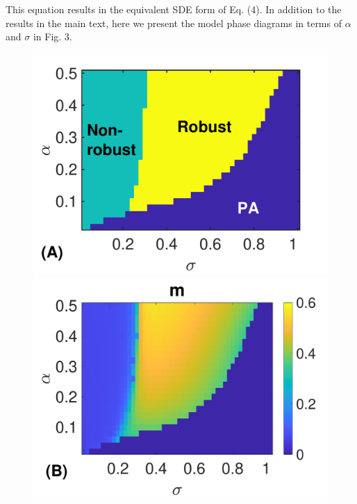 \documentclass[%
 reprint,
superscriptaddress,
 amsmath,amssymb,
 prl,
]{revtex4-2}
\begin{document}
 This equation results  in the equivalent SDE form of Eq. (4). %
 In addition to the results in the main text, here we present the model phase diagrams in terms of $\alpha$ and $\sigma$ in Fig. 3.
 \begin{figure}[b]
 \includegraphics[scale=0.22]{fig2a-eps-converted-to.pdf}
\includegraphics[scale=0.22]{fig1b-eps-converted-to.pdf}

\end{figure}
\end{document}
